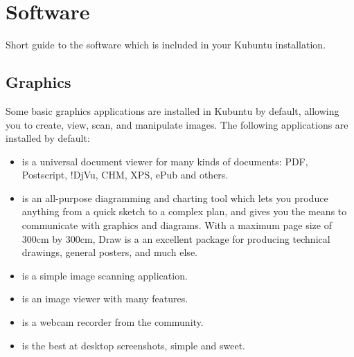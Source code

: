 \documentclass[letterpaper,10pt,english]{sphinxmanual}
\begin{document}


\chapter{Software}
\label{\detokenize{docs/software:software}}\label{\detokenize{docs/software::doc}}\label{\detokenize{docs/software:software-link}}
Short guide to the software which is included in your Kubuntu installation.


\section{Graphics}
\label{\detokenize{docs/software:graphics}}
Some basic graphics applications are installed in Kubuntu by default, allowing you to create, view, scan, and manipulate images. The following applications are installed by default:
\begin{itemize}
\item {} 
 is a universal document viewer for many kinds of documents: PDF, Postscript, !DjVu, CHM, XPS, ePub and others.

\item {} 
 is an all-purpose diagramming and charting tool which lets you produce anything from a quick sketch to a complex plan, and gives you the means to communicate with graphics and diagrams. With a maximum page size of 300cm by 300cm, Draw is a an excellent package for producing technical drawings, general posters, and much else.

\item {} 
 is a simple image scanning application.

\item {} 
 is an image viewer with many features.

\item {} 
 is a webcam recorder from the  community.

\item {} 
 is the best at desktop screenshots, simple and sweet.

\end{itemize}
\end{document}
